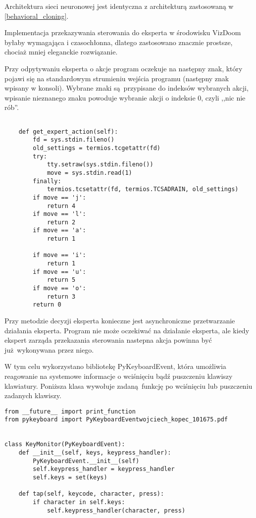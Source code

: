 Architektura sieci neuronowej jest identyczna z architekturą zastosowaną w \ref{behavioral_cloning}.

Implementacja przekazywania sterowania do eksperta w środowisku VizDoom byłaby wymagająca i czasochłonna, dlatego zastosowano znacznie prostsze, chociaż mniej eleganckie rozwiązanie.

Przy odpytywaniu eksperta o akcje program oczekuje na następny znak, który pojawi się na standardowym strumieniu wejścia programu (następny znak wpisany w konsoli). Wybrane znaki są przypisane do indeksów wybranych akcji, wpisanie nieznanego znaku powoduje wybranie akcji o indeksie 0, czyli ,,nic nie rób''.

\begin{lstlisting}[language=iPython]

    def get_expert_action(self):
        fd = sys.stdin.fileno()
        old_settings = termios.tcgetattr(fd)
        try:
            tty.setraw(sys.stdin.fileno())
            move = sys.stdin.read(1)
        finally:
            termios.tcsetattr(fd, termios.TCSADRAIN, old_settings)
        if move == 'j':
            return 4
        if move == 'l':
            return 2
        if move == 'a':
            return 1

        if move == 'i':
            return 1
        if move == 'u':
            return 5
        if move == 'o':
            return 3
        return 0
\end{lstlisting}

Przy metodzie decyzji eksperta konieczne jest asynchroniczne przetwarzanie działania eksperta. Program nie może oczekiwać na działanie eksperta, ale kiedy ekspert zarząda przekazania sterowania nastepna akcja powinna być już wykonywana przez niego.

W tym celu wykorzystano bibliotekę PyKeyboardEvent, która umożliwia reagowanie na systemowe informacje o wciśnięciu bądź puszczeniu klawiszy klawiatury. Poniższa klasa wywołuje zadaną funkcję po wciśnięciu lub puszczeniu zadanych klawiszy.


\begin{lstlisting}[language=iPython]
from __future__ import print_function
from pykeyboard import PyKeyboardEventwojciech_kopec_101675.pdf


class KeyMonitor(PyKeyboardEvent):
    def __init__(self, keys, keypress_handler):
        PyKeyboardEvent.__init__(self)
        self.keypress_handler = keypress_handler
        self.keys = set(keys)

    def tap(self, keycode, character, press):
        if character in self.keys:
            self.keypress_handler(character, press)
\end{lstlisting}

